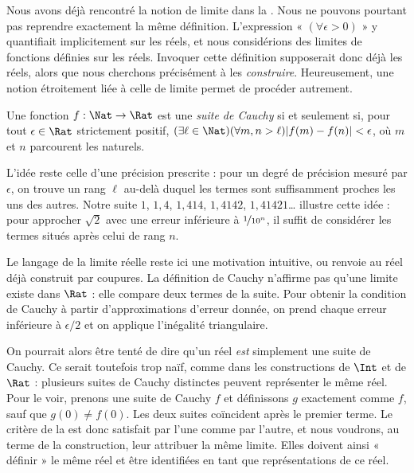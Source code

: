 \documentclass[11pt,a4paper,openany]{memoir}
\begin{document}
Nous avons déjà rencontré la notion de limite dans la
. Nous ne pouvons pourtant pas reprendre
exactement la même définition. L'expression « $(\forall\epsilon>0)$ »
y quantifiait implicitement sur les réels, et nous considérions des
limites de fonctions définies sur les réels. Invoquer cette définition
supposerait donc déjà les réels, alors que nous cherchons précisément
à les \emph{construire}. Heureusement, une notion étroitement liée à
celle de limite permet de procéder autrement.
\begin{defn}
Une fonction $f:\Nat\to\Rat$ est une \emph{suite de Cauchy} si et
seulement si, pour tout $\epsilon\in\Rat$ strictement positif,
$(\exists\ell\in\Nat)(\forall m,n>\ell)|f(m)-f(n)|<\epsilon$,
où $m$ et $n$ parcourent les naturels.
\end{defn}

L'idée reste celle d'une précision prescrite : pour un degré de
précision mesuré par $\epsilon$, on trouve un rang $\ell$ au-delà
duquel les termes sont suffisamment proches les uns des autres.
Notre suite $1$, $1{,}4$, $1{,}414$, $1{,}4142$, $1{,}41421$\ldots
illustre cette idée : pour approcher $\sqrt{2}$ avec une erreur
inférieure à $\nicefrac{1}{10^n}$, il suffit de considérer les termes
situés après celui de rang $n$.
\begin{editorial}
Le langage de la limite réelle reste ici une motivation intuitive,
ou renvoie au réel déjà construit par coupures. La définition de
Cauchy n'affirme pas qu'une limite existe dans $\Rat$ : elle compare
deux termes de la suite. Pour obtenir la condition de Cauchy à partir
d'approximations d'erreur donnée, on prend chaque erreur inférieure à
$\epsilon/2$ et on applique l'inégalité triangulaire.
\end{editorial}

On pourrait alors être tenté de dire qu'un réel \emph{est} simplement
une suite de Cauchy. Ce serait toutefois trop naïf, comme dans les
constructions de $\Int$ et de $\Rat$ : plusieurs suites de Cauchy
distinctes peuvent représenter le même réel. Pour le voir, prenons une
suite de Cauchy $f$ et définissons $g$ exactement comme $f$, sauf que
$g(0)\neq f(0)$. Les deux suites coïncident après le premier terme.
Le critère de la  est donc satisfait par l'une
comme par l'autre, et nous voudrons, au terme de la construction, leur
attribuer la même limite. Elles doivent ainsi « définir » le même réel
et être identifiées en tant que représentations de ce réel.
\end{document}
